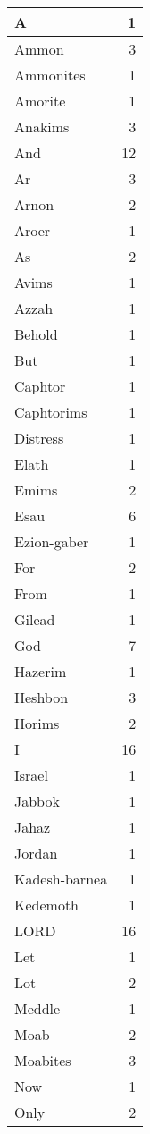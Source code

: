 \begin{center}
\begin{longtable}{l|r}
\hline \hline
\endlastfoot
A & 1 \\ \hline
Ammon & 3 \\ \hline
Ammonites & 1 \\ \hline
Amorite & 1 \\ \hline
Anakims & 3 \\ \hline
And & 12 \\ \hline
Ar & 3 \\ \hline
Arnon & 2 \\ \hline
Aroer & 1 \\ \hline
As & 2 \\ \hline
Avims & 1 \\ \hline
Azzah & 1 \\ \hline
Behold & 1 \\ \hline
But & 1 \\ \hline
Caphtor & 1 \\ \hline
Caphtorims & 1 \\ \hline
Distress & 1 \\ \hline
Elath & 1 \\ \hline
Emims & 2 \\ \hline
Esau & 6 \\ \hline
Ezion-gaber & 1 \\ \hline
For & 2 \\ \hline
From & 1 \\ \hline
Gilead & 1 \\ \hline
God & 7 \\ \hline
Hazerim & 1 \\ \hline
Heshbon & 3 \\ \hline
Horims & 2 \\ \hline
I & 16 \\ \hline
Israel & 1 \\ \hline
Jabbok & 1 \\ \hline
Jahaz & 1 \\ \hline
Jordan & 1 \\ \hline
Kadesh-barnea & 1 \\ \hline
Kedemoth & 1 \\ \hline
LORD & 16 \\ \hline
Let & 1 \\ \hline
Lot & 2 \\ \hline
Meddle & 1 \\ \hline
Moab & 2 \\ \hline
Moabites & 3 \\ \hline
Now & 1 \\ \hline
Only & 2 \\ \hline

\end{longtable}
\end{center}
